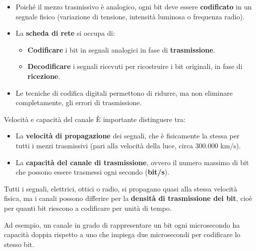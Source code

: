 \documentclass[a4paper,12pt]{report}
\begin{document}
\begin{itemize}
    \item Poiché il mezzo trasmissivo è analogico, ogni bit deve essere \textbf{codificato} in un segnale fisico (variazione di tensione, intensità luminosa o frequenza radio).
    \item La \textbf{scheda di rete} si occupa di:
    \begin{itemize}
        \item \textbf{Codificare} i bit in segnali analogici in fase di \textbf{trasmissione}.
        \item \textbf{Decodificare} i segnali ricevuti per ricostruire i bit originali, in fase di \textbf{ricezione}.
    \end{itemize}
    \item Le tecniche di codifica digitali permettono di ridurre, ma non eliminare completamente, gli errori di trasmissione.
\end{itemize}

\begin{notebox}{Velocità e capacità del canale}
È importante distinguere tra:
\begin{itemize}
    \item La \textbf{velocità di propagazione} dei segnali, che è fisicamente la stessa per tutti i mezzi trasmissivi (pari alla velocità della luce, circa 300.000 km/s).
    \item La \textbf{capacità del canale di trasmissione}, ovvero il numero massimo di bit che possono essere trasmessi ogni secondo (\textbf{bit/s}).
\end{itemize}

Tutti i segnali, elettrici, ottici o radio, si propagano quasi alla stessa velocità fisica, ma i canali possono differire per la \textbf{densità di trasmissione dei bit}, cioè per quanti bit riescono a codificare per unità di tempo.

Ad esempio, un canale in grado di rappresentare un bit ogni microsecondo ha capacità doppia rispetto a uno che impiega due microsecondi per codificare lo stesso bit.
\end{notebox}
\end{document}

